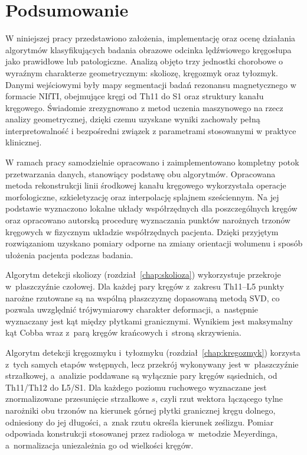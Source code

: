 \chapter{Podsumowanie}
\label{chap:podsumowanie}

W niniejszej pracy przedstawiono założenia, implementację oraz ocenę działania algorytmów klasyfikujących badania obrazowe odcinka lędźwiowego kręgosłupa jako prawidłowe lub patologiczne.
Analizą objęto trzy jednostki chorobowe o wyraźnym charakterze geometrycznym: skoliozę, kręgozmyk oraz tyłozmyk. Danymi wejściowymi były mapy segmentacji badań rezonansu magnetycznego w formacie NIfTI, obejmujące kręgi od Th11 do S1 oraz struktury kanału kręgowego. Świadomie zrezygnowano z metod uczenia maszynowego na rzecz analizy geometrycznej, dzięki czemu uzyskane wyniki zachowały pełną interpretowalność i bezpośredni związek z parametrami stosowanymi w praktyce klinicznej.

W ramach pracy samodzielnie opracowano i zaimplementowano kompletny potok przetwarzania danych, stanowiący podstawę obu algorytmów. Opracowana metoda rekonstrukcji linii środkowej kanału kręgowego wykorzystała operacje morfologiczne, szkieletyzację oraz interpolację splajnem sześciennym. Na jej podstawie wyznaczono lokalne układy współrzędnych dla poszczególnych kręgów oraz opracowano autorską procedurę wyznaczania punktów narożnych trzonów kręgowych w fizycznym układzie współrzędnych pacjenta. Dzięki przyjętym rozwiązaniom uzyskano pomiary odporne na zmiany orientacji wolumenu i sposób ułożenia pacjenta podczas badania.

Algorytm detekcji skoliozy (rozdział~\ref{chap:skolioza}) wykorzystuje przekroje w~płaszczyźnie czołowej.
Dla każdej pary kręgów z~zakresu Th11--L5 punkty narożne rzutowane są na wspólną płaszczyznę dopasowaną metodą SVD, co pozwala uwzględnić trójwymiarowy charakter deformacji, a~następnie wyznaczany jest kąt między płytkami granicznymi.
Wynikiem jest maksymalny kąt Cobba wraz z~parą kręgów krańcowych i~stroną skrzywienia.

Algorytm detekcji kręgozmyku i~tyłozmyku (rozdział~\ref{chap:kregozmyk}) korzysta z~tych samych etapów wstępnych, lecz przekrój wykonywany jest w~płaszczyźnie strzałkowej, a~analizie poddawane są wyłącznie pary kręgów sąsiednich, od Th11/Th12 do L5/S1.
Dla każdego poziomu ruchowego wyznaczane jest znormalizowane przesunięcie strzałkowe $s$, czyli rzut wektora łączącego tylne narożniki obu trzonów na kierunek górnej płytki granicznej kręgu dolnego, odniesiony do jej długości, a~znak rzutu określa kierunek ześlizgu.
Pomiar odpowiada konstrukcji stosowanej przez radiologa w~metodzie Meyerdinga, a~normalizacja uniezależnia go od wielkości kręgów.

